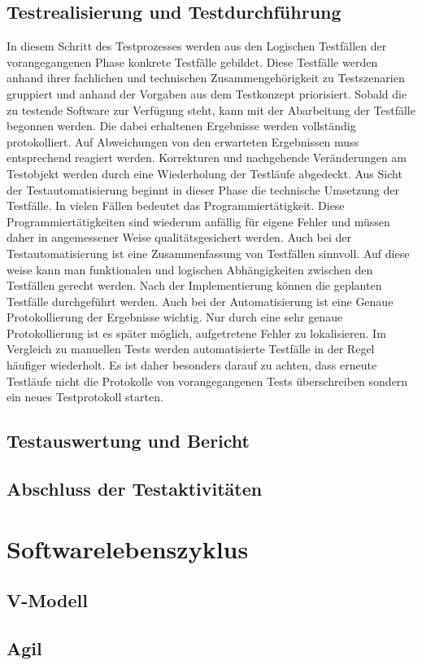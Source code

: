\subsection{Testrealisierung und Testdurchführung}
\label{subsec:testrealisierung_und_durchführung}
In diesem Schritt des Testprozesses werden aus den Logischen Testfällen der vorangegangenen Phase konkrete Testfälle gebildet.
Diese Testfälle werden anhand ihrer fachlichen und technischen Zusammengehörigkeit zu Testszenarien gruppiert und anhand der Vorgaben aus dem Testkonzept priorisiert.
Sobald die zu testende Software zur Verfügung steht, kann mit der Abarbeitung der Testfälle begonnen werden. Die dabei erhaltenen Ergebnisse werden vollständig protokolliert. Auf Abweichungen von den erwarteten Ergebnissen muss entsprechend reagiert werden. Korrekturen und nachgehende Veränderungen am Testobjekt werden durch eine Wiederholung der Testläufe abgedeckt.
Aus Sicht der Testautomatisierung beginnt in dieser Phase die technische Umsetzung der Testfälle.
In vielen Fällen bedeutet das Programmiertätigkeit. Diese Programmiertätigkeiten sind wiederum anfällig für eigene Fehler und müssen daher in angemessener Weise qualitätsgesichert werden. Auch bei der Testautomatisierung ist eine Zusammenfassung von Testfällen sinnvoll. Auf diese weise kann man funktionalen und logischen Abhängigkeiten zwischen den Testfällen gerecht werden.
Nach der Implementierung können die geplanten Testfälle durchgeführt werden.
Auch bei der Automatisierung ist eine Genaue Protokollierung der Ergebnisse wichtig.
Nur durch eine sehr genaue Protokollierung ist es später möglich, aufgetretene Fehler zu lokalisieren.
Im Vergleich zu manuellen Tests werden automatisierte Testfälle in der Regel häufiger wiederholt. Es ist daher besonders darauf zu achten, dass erneute Testläufe nicht die Protokolle von vorangegangenen Tests überschreiben sondern ein neues Testprotokoll starten.

\subsection{Testauswertung und Bericht}
\label{subsec:testauswertung_und_bericht}


\subsection{Abschluss der Testaktivitäten}
\label{subsec:abschluss_der_testaktivitäten}



\section{Softwarelebenszyklus}
\label{sec:softwarelebenszyklus}



\subsection{V-Modell}
\label{subsec:vmodell}
\subsection{Agil}
\label{subsec:agil}

